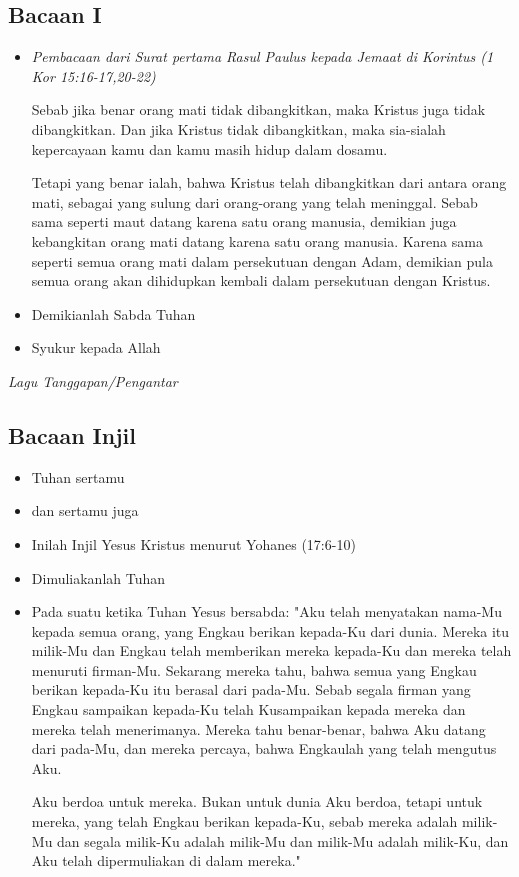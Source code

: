 \documentclass[10pt,landscape]{article}
\makeatletter
\newcommand{\lagu}[1]{%
  {\parindent \z@ 
    \interlinepenalty\@M \slshape \mdseries \large \textit{#1}\par\nobreak \vskip 10\p@ }}
\newcommand{\BU}[1]{\begin{itemize} \item[U:] #1 \end{itemize}}
\newcommand{\BI}[1]{\begin{itemize} \item[I:] #1 \end{itemize}}
\newcommand{\BP}[1]{\begin{itemize} \item[P:] #1 \end{itemize}}
\makeatother
\begin{document}
\begin{multicols}{3}
\subsection*{Bacaan I}

\BP{\emph{Pembacaan dari Surat pertama Rasul Paulus kepada Jemaat di Korintus (1 Kor 15:16-17,20-22)}

Sebab jika benar orang mati tidak dibangkitkan, maka Kristus juga tidak dibangkitkan.
Dan jika Kristus tidak dibangkitkan, maka sia-sialah kepercayaan kamu dan kamu masih hidup dalam dosamu.

Tetapi yang benar ialah, bahwa Kristus telah dibangkitkan dari antara orang mati, sebagai yang sulung dari orang-orang yang telah meninggal.
Sebab sama seperti maut datang karena satu orang manusia, demikian juga kebangkitan orang mati datang karena satu orang manusia.
Karena sama seperti semua orang mati dalam persekutuan dengan Adam, demikian pula semua orang akan dihidupkan kembali dalam persekutuan dengan Kristus.

}

\BP{Demikianlah Sabda Tuhan}

\BU{Syukur kepada Allah}

\lagu{Lagu Tanggapan/Pengantar}

\subsection*{Bacaan Injil}

\BI{Tuhan sertamu}
\BU{dan sertamu juga}
\BI{Inilah Injil Yesus Kristus menurut Yohanes (17:6-10)}
\BU{Dimuliakanlah Tuhan}

\BI{
Pada suatu ketika Tuhan Yesus bersabda: "Aku telah menyatakan nama-Mu kepada semua orang, yang Engkau berikan kepada-Ku dari dunia. Mereka itu milik-Mu dan Engkau telah memberikan mereka kepada-Ku dan mereka telah menuruti firman-Mu.
Sekarang mereka tahu, bahwa semua yang Engkau berikan kepada-Ku itu berasal dari pada-Mu.
Sebab segala firman yang Engkau sampaikan kepada-Ku telah Kusampaikan kepada mereka dan mereka telah menerimanya. Mereka tahu benar-benar, bahwa Aku datang dari pada-Mu, dan mereka percaya, bahwa Engkaulah yang telah mengutus Aku.

Aku berdoa untuk mereka. Bukan untuk dunia Aku berdoa, tetapi untuk mereka, yang telah Engkau berikan kepada-Ku, sebab mereka adalah milik-Mu
dan segala milik-Ku adalah milik-Mu dan milik-Mu adalah milik-Ku, dan Aku telah dipermuliakan di dalam mereka."
}


\end{multicols}
\end{document}
